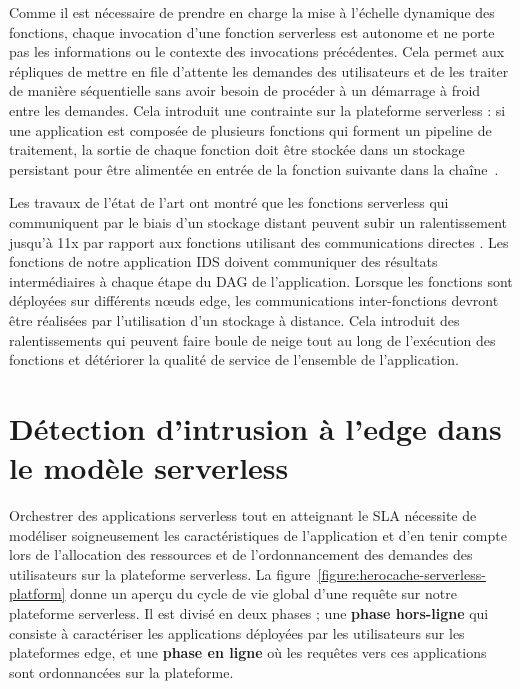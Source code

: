 Comme il est nécessaire de prendre en charge la mise à l'échelle dynamique des fonctions, chaque invocation d'une fonction serverless est autonome et ne porte pas les informations ou le contexte des invocations précédentes. Cela permet aux répliques de mettre en file d'attente les demandes des utilisateurs et de les traiter de manière séquentielle sans avoir besoin de procéder à un démarrage à froid entre les demandes. Cela introduit une contrainte sur la plateforme serverless : si une application est composée de plusieurs fonctions qui forment un pipeline de traitement, la sortie de chaque fonction doit être stockée dans un stockage persistant pour être alimentée en entrée de la fonction suivante dans la chaîne~\cite{mullerLambadaInteractiveData2020}.

Les travaux de l'état de l'art ont montré que les fonctions serverless qui communiquent par le biais d'un stockage distant peuvent subir un ralentissement jusqu'à 11x par rapport aux fonctions utilisant des communications directes \cite{wawrzoniakBoxerDataAnalytics2021a}. Les fonctions de notre application IDS doivent communiquer des résultats intermédiaires à chaque étape du DAG de l'application. Lorsque les fonctions sont déployées sur différents nœuds edge, les communications inter-fonctions devront être réalisées par l'utilisation d'un stockage à distance. Cela introduit des ralentissements qui peuvent faire boule de neige tout au long de l'exécution des fonctions et détériorer la qualité de service de l'ensemble de l'application.

\section{Détection d'intrusion à l'edge dans le modèle serverless}
\label{section:herocache-before-contrib}

Orchestrer des applications serverless tout en atteignant le SLA nécessite de modéliser soigneusement les caractéristiques de l'application et d'en tenir compte lors de l'allocation des ressources et de l'ordonnancement des demandes des utilisateurs sur la plateforme serverless. La figure~\ref{figure:herocache-serverless-platform} donne un aperçu du cycle de vie global d'une requête sur notre plateforme serverless. Il est divisé en deux phases ; une \textbf{phase hors-ligne} qui consiste à caractériser les applications déployées par les utilisateurs sur les plateformes edge, et une \textbf{phase en ligne} où les requêtes vers ces applications sont ordonnancées sur la plateforme.

